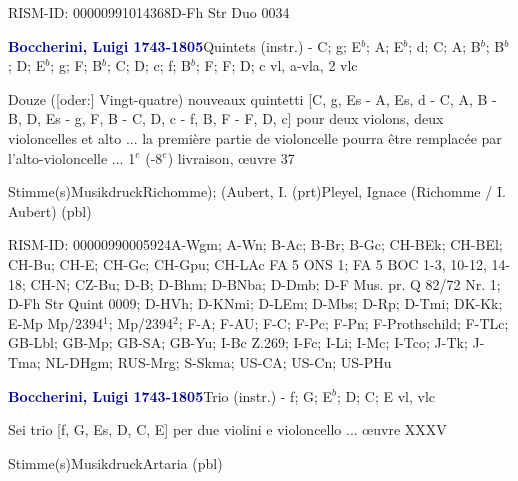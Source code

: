 \documentclass[twocolumn, 12pt]{book}
\begin{document}
\par RISM-ID: 00000991014368\newline D-Fh  Str Duo 0034
\par \vspace{16pt} \textcolor{darkblue}{\textbf{Boccherini, Luigi  1743-1805}}\hfillplus{\textbf{[244]}}\newline Quintets (instr.) - C; g; E$^b$; A; E$^b$; d; C; A; B$^b$; B$^b$; D; E$^b$; g; F; B$^b$; C; D; c; f; B$^b$; F; F; D; c vl, a-vla, 2 vlc
\par \begin{itshape}Douze ([oder:] Vingt-quatre) nouveaux quintetti [C, g, Es - A, Es, d - C, A, B - B, D, Es - g, F, B - C, D, c - f, B, F - F, D, c] pour deux violons, deux violoncelles et alto ... la première partie de violoncelle pourra être remplacée par l'alto-violoncelle ... 1$^e$ (-8$^e$) livraison, œuvre 37\end{itshape} 
\par \textcolor{darkblue}{}  Stimme(s)\newline Musikdruck\newline Richomme); (Aubert, I.  (prt)\newline Pleyel, Ignace (Richomme / I. Aubert)  (pbl)
\par RISM-ID: 00000990005924\newline A-Wgm; A-Wn; B-Ac; B-Br; B-Gc; CH-BEk; CH-BEl; CH-Bu; CH-E; CH-Gc; CH-Gpu; CH-LAc  FA 5 ONS 1; FA 5 BOC 1-3, 10-12, 14-18; CH-N; CZ-Bu; D-B; D-Bhm; D-BNba; D-Dmb; D-F  Mus. pr. Q 82/72 Nr. 1; D-Fh  Str Quint 0009; D-HVh; D-KNmi; D-LEm; D-Mbs; D-Rp; D-Tmi; DK-Kk; E-Mp  Mp/2394$^1$; Mp/2394$^2$; F-A; F-AU; F-C; F-Pc; F-Pn; F-Prothschild; F-TLc; GB-Lbl; GB-Mp; GB-SA; GB-Yu; I-Bc  Z.269; I-Fc; I-Li; I-Mc; I-Tco; J-Tk; J-Tma; NL-DHgm; RUS-Mrg; S-Skma; US-CA; US-Cn; US-PHu
\par \vspace{16pt} \textcolor{darkblue}{\textbf{Boccherini, Luigi  1743-1805}}\hfillplus{\textbf{[245]}}\newline Trio (instr.) - f; G; E$^b$; D; C; E vl, vlc
\par \begin{itshape}Sei trio [f, G, Es, D, C, E] per due violini e violoncello ... œuvre XXXV\end{itshape} 
\par \textcolor{darkblue}{}  Stimme(s)\newline Musikdruck\newline Artaria  (pbl)
\end{document}
